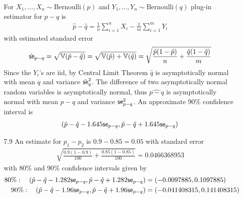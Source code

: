 \documentclass[a4paper,10pt]{article}
\theoremstyle{definition}
\begin{document}
\begin{enumerate}
For $X_1, \ldots, X_n \sim \text{Bernoulli}(p)$ and $Y_1, \ldots, Y_n \sim \text{Bernoulli}(q)$ plug-in estimator for $p-q$ is 
\begin{align*}
\hat{p}-\hat{q}=\frac{1}{n}\sum_{i=1}^{n}X_i - \frac{1}{m}\sum_{i=1}^{m}Y_i
\end{align*}
with estimated standard error 
\begin{align*}
\hat{\text{\sffamily se}}_{p-q} = \sqrt{\mathbb{V}(\hat{p}-\hat{q})} = \sqrt{\mathbb{V}(\hat{p})+\mathbb{V}(\hat{q})}= \sqrt{\frac{\hat{p}(1-\hat{p})}{n}+\frac{\hat{q}(1-\hat{q})}{m} }
\end{align*}
Since the $Y_i$'s are iid, by Central Limit Theorem $\hat{q}$ is asymptotically normal with mean $q$ and variance $\hat{\text{\sffamily se}}_q^2$. The difference of two asymptotically normal random variables is asymptotically normal, thus $\hat{p-q}$ is asymptotically normal with mean $p-q$ and variance $\text{\sffamily se}_{p-q}^2$. An approximate $90\%$ confidence interval is 
\begin{align*}
(\hat{p}-\hat{q}-1.645\text{\sffamily se}_{p-q},\hat{p}-\hat{q}+1.645\text{\sffamily se}_{p-q})
\end{align*}
\item[7.9] An estimate for $p_1-p_2$ is $0.9-0.85=0.05$ with standard error 
\begin{align*}
\sqrt{\frac{0.9(1-0.9)}{100}+\frac{0.85(1-0.85)}{100}}= 0.0466368953
\end{align*}
with $80\%$ and $90\%$ confidence intervals given by
\begin{align*}
80\%:\quad(\hat{p}-\hat{q}-1.282\text{\sffamily se}_{p-q},\hat{p}-\hat{q}+1.282\text{\sffamily se}_{p-q})&=(-0.0097885,0.1097885)\\
90\%:\quad(\hat{p}-\hat{q}-1.96\text{\sffamily se}_{p-q},\hat{p}-\hat{q}+1.96\text{\sffamily se}_{p-q})&=(-0.041408315,0.141408315)
\end{align*} 


\end{enumerate}
\end{document}
